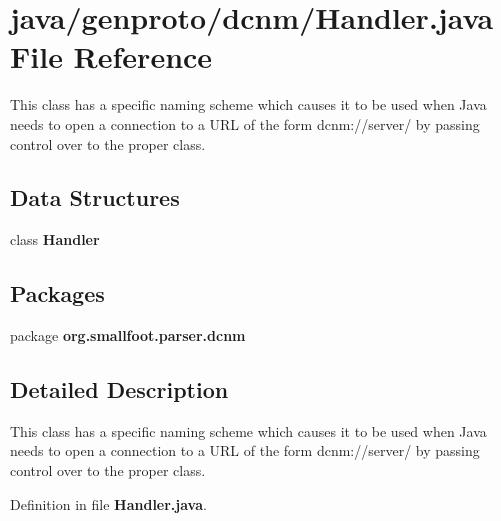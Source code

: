 \section{java/genproto/dcnm/\+Handler.java File Reference}
\label{genproto_2dcnm_2Handler_8java}


This class has a specific naming scheme which causes it to be used when Java needs to open a connection to a U\+R\+L of the form dcnm\+://server/ by passing control over to the proper class.  


\subsection*{Data Structures}
\begin{DoxyCompactItemize}
\item 
class {\bf Handler}
\end{DoxyCompactItemize}
\subsection*{Packages}
\begin{DoxyCompactItemize}
\item 
package {\bf org.\+smallfoot.\+parser.\+dcnm}
\end{DoxyCompactItemize}


\subsection{Detailed Description}
This class has a specific naming scheme which causes it to be used when Java needs to open a connection to a U\+R\+L of the form dcnm\+://server/ by passing control over to the proper class. 



Definition in file {\bf Handler.\+java}.

